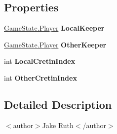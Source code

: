 \subsection*{Properties}
\begin{DoxyCompactItemize}
\item 
\hypertarget{class_battle_handler_a88981ecb333f8bec6b191700602f672e}{\hyperlink{struct_game_state_1_1_player}{Game\-State.\-Player} {\bfseries Local\-Keeper}}\label{class_battle_handler_a88981ecb333f8bec6b191700602f672e}

\item 
\hypertarget{class_battle_handler_a98377d96ef4b291ea9603714030f3b61}{\hyperlink{struct_game_state_1_1_player}{Game\-State.\-Player} {\bfseries Other\-Keeper}}\label{class_battle_handler_a98377d96ef4b291ea9603714030f3b61}

\item 
\hypertarget{class_battle_handler_a03afb3776c24d8dbe13a9959f7a52a71}{int {\bfseries Local\-Cretin\-Index}}\label{class_battle_handler_a03afb3776c24d8dbe13a9959f7a52a71}

\item 
\hypertarget{class_battle_handler_aa20edb29e29187f8fd01f934376df8e4}{int {\bfseries Other\-Cretin\-Index}}\label{class_battle_handler_aa20edb29e29187f8fd01f934376df8e4}

\end{DoxyCompactItemize}


\subsection{Detailed Description}


$<$author$>$Jake Ruth$<$/author$>$ 

